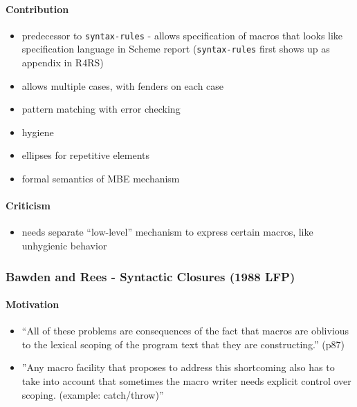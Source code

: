 \documentclass[12pt]{article}	%
\begin{document}
\paragraph{Contribution}
\begin{itemize}
	\item predecessor to \verb!syntax-rules! - allows specification of macros that looks like specification language in Scheme report (\verb!syntax-rules! first shows up as appendix in R4RS)
	\item allows multiple cases, with fenders on each case
	\item pattern matching with error checking
	\item hygiene
	\item ellipses for repetitive elements
	\item formal semantics of MBE mechanism
\end{itemize}
\paragraph{Criticism}
\begin{itemize}
	\item needs separate ``low-level'' mechanism to express certain macros, like unhygienic behavior
\end{itemize}

\subsubsection*{Bawden and Rees - Syntactic Closures (1988 LFP)}
\paragraph{Motivation}
\begin{itemize}
	\item ``All of these problems are consequences of the fact that macros are oblivious to the lexical scoping of the program text that they are constructing.'' (p87)
	\item ''Any macro facility that proposes to address this shortcoming also has to take into account that sometimes the macro writer needs explicit control over scoping. (example: catch/throw)''
\end{itemize}
\end{document}
